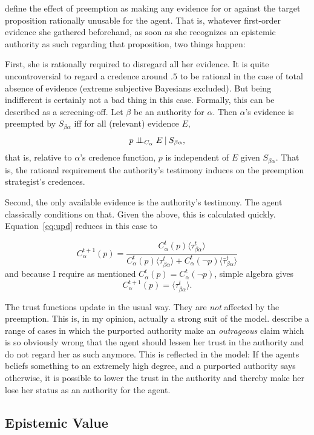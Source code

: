 \documentclass[11pt, a4paper]{article}
\newcommand{\given}[1][]{\:#1\vert\:}
\newcommand{\CI}{\mathrel{\perp\mspace{-10mu}\perp}}
\renewcommand{\i}[1]{\emph{#1}}
\renewcommand{\a}{\alpha}
\begin{document}
\textcite[p.12]{Constantin2017} define the effect of preemption as making any evidence for or against the target proposition rationally unusable for the agent. That is, whatever first-order evidence she gathered beforehand, as soon as she recognizes an epistemic authority as such regarding that proposition, two things happen: 

First, she is rationally required to disregard all her evidence. It is quite uncontroversial to regard a credence around $.5$ to be rational in the case of total absence of evidence (extreme subjective Bayesians excluded). But being indifferent is certainly not a bad thing in this case. Formally, this can be described as a screening-off. Let $\beta$ be an authority for $\alpha$. Then $\a$'s evidence is preempted by $S_{\beta\a}$ iff for all (relevant) evidence $E$, 
\[ 
    p \CI_{C_\a} E \given S_{\beta\a}, 
\]
that is, relative to $\a$'s credence function, $p$ is independent of $E$ given $S_{\beta\a}$. That is, the rational requirement the authority's testimony induces on the preemption strategist's credences.

Second, the only available evidence is the authority's testimony. The agent classically conditions on that. Given the above, this is calculated quickly. Equation~\ref{eq:upd} reduces in this case to 

\[
    C^{t+1}_\a (p) = \frac{C^t_\a(p) \langle \tau^t_{\beta\a} \rangle}
    {C^t_\a(p) \langle \tau^t_{\beta\a} \rangle + C^t_\a(\neg p) \langle \bar{\tau}^t_{\beta\a} \rangle}
\]
and because I require as mentioned $C^t_\a(p) = C^t_\a( \neg p)$, simple algebra gives 
\[
    C^{t+1}_\a (p) = \langle \tau^t_{\beta\a} \rangle.
\]

The trust functions update in the usual way. They are \i{not} affected by the preemption. This is, in my opinion, actually a strong suit of the model. \textcite[p. XX]{Constantin2017} describe a range of cases in which the purported authority make an  \i{outrageous} claim which is so obviously wrong that the agent should lessen her trust in the authority and do not regard her as such anymore. This is reflected in the model: If the agents beliefs something to an extremely high degree, and a purported authority says otherwise, it is possible to lower the trust in the authority and thereby make her lose her status as an authority for the agent. 

\subsection{Epistemic Value}
\end{document}

